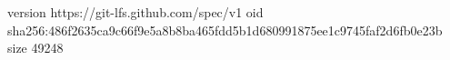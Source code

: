 version https://git-lfs.github.com/spec/v1
oid sha256:486f2635ca9c66f9e5a8b8ba465fdd5b1d680991875ee1c9745faf2d6fb0e23b
size 49248
